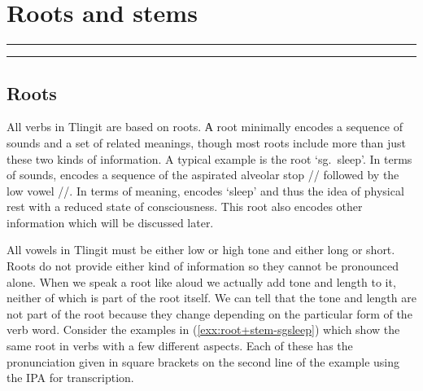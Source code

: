 
\resetexcnt
\chapter{Roots and stems}

\startcontents[chapters]
\noindent\rule[0.5em]{\textwidth}{\heavyrulewidth}
\noindent\rule{\textwidth}{\heavyrulewidth}
\vspace{1\baselineskip}


\section{Roots}\label{sec:root+stem-roots}

All verbs in Tlingit are based on roots. А root minimally encodes a sequence of sounds and a set of related meanings, though most roots include more than just these two kinds of information. A typical example is the root  ‘sg.\ sleep’. In terms of sounds,  encodes a sequence of the aspirated alveolar stop  // followed by the low vowel  //. In terms of meaning,  encodes ‘sleep’ and thus the idea of physical rest with a reduced state of consciousness. This root also encodes other information which will be discussed later.

All vowels in Tlingit must be either low or high tone and either long or short. Roots do not provide either kind of information so they cannot be pronounced alone. When we speak a root like  aloud we actually add tone and length to it, neither of which is part of the root itself. We can tell that the tone and length are not part of the root because they change depending on the particular form of the verb word. Consider the examples in (\ref{exx:root+stem-sgsleep}) which show the same root in verbs with a few different aspects. Each of these has the pronunciation given in square brackets on the second line of the example using the IPA for transcription.

